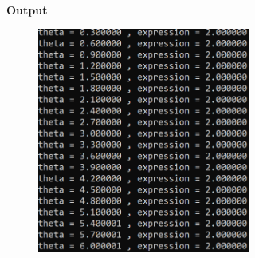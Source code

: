 \documentclass[journal,12pt,twocolumn]{IEEEtran}
\begin{document}
\\\textbf{\Large{Output}}
\begin{figure}[H]
\begin{center}
\includegraphics[width=2.75in]{fig.png}
\end{center}
\end{figure}
\end{document}
